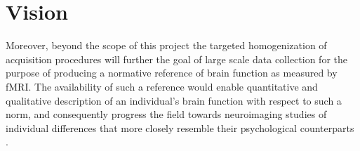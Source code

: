 \section{Vision}
%
Moreover, beyond the scope of this project the targeted homogenization of
acquisition procedures will further the goal of large scale data collection for
the purpose of producing a normative reference of brain function as measured by
fMRI.
%
The availability of such a reference would enable quantitative and qualitative
description of an individual's brain function with respect to such a norm, and
consequently progress the field towards neuroimaging studies of individual
differences that more closely resemble their psychological counterparts
\citep{dubois2016building}.
